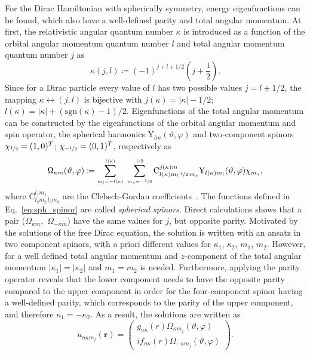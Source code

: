 For the Dirac Hamiltonian with spherically symmetry, energy eigenfunctions can be found, which also have a well-defined parity and total angular momentum. At first, the relativistic angular quantum number $\kappa$ is introduced as a function of the orbital angular momentum quantum number $l$ and total angular momentum quantum number $j$ as
\begin{equation}
\kappa(j,l) \coloneqq (-1)^{j+l+1/2} \left(j+\frac{1}{2}\right).
\end{equation}
Since for a Dirac particle every value of $l$ has two possible values $j=l\pm 1/2$, the mapping $\kappa \leftrightarrow (j,l)$ is bijective with $j(\kappa)=|\kappa|-1/2$; $l(\kappa)=|\kappa|+(\mathrm{sgn}(\kappa)-1)/2$. Eigenfunctions of the total angular momentum can be constructed by the eigenfunctions of the orbital angular momentum and spin operator, the spherical harmonics $\text{Y}_{lm}(\vartheta,\varphi)$ and two-component spinors $\chi_{\nicefrac{1}{2}}=(1,0)^T$; $\chi_{\nicefrac{-1}{2}}=(0,1)^T$, respectively as
\begin{equation}
\Omega_{\kappa m}(\vartheta,\varphi)\coloneqq
\sum_{{\scriptscriptstyle {m_l}{=}{-l(\kappa)}}}^{\scriptscriptstyle l(\kappa)}\;
\sum_{{\scriptscriptstyle {m_s}{=}{\nicefrac{-1}{2}}}}^{\scriptscriptstyle \nicefrac{1}{2}}
\text{C}^{j(\kappa)m}_{l(\kappa)m_l\,\nicefrac{1}{2}\,m_s}
\text{Y}_{l(\kappa)m_l}(\vartheta,\varphi)\chi_{m_s},
\label{eq:sph_spinor}
\end{equation}
where $\text{C}^{l_1m_1}_{l_2m_2\,l_3m_3}$ are the Clebsch-Gordan coefficients~\cite{varshalovich1988}. The functions defined in Eq.~\eqref{eq:sph_spinor} are called \textit{spherical spinors}. Direct calculations shows that a pair \mbox{($\Omega_{\kappa m}$, $\Omega_{-\kappa m}$)} have the same values for $j$, but opposite parity. Motivated by the solutions of the free Dirac equation, the solution is written with an ansatz in two component spinors, with a priori different values for $\kappa_1$, $\kappa_2$, $m_1$, $m_2$. 
However, for a well defined total angular momentum and $z$-component of the total angular momentum $|\kappa_1|=|\kappa_2|$ and $m_1=m_2$ is needed. Furthermore, applying the parity operator reveals that the lower component needs to have the opposite parity compared to the upper component in order for the four-component spinor having a well-defined parity, which corresponds to the parity of the upper component, and therefore $\kappa_1=-\kappa_2$. As a result, the solutions are written as
\begin{equation}
u_{n\kappa m_j}(\mathbf{r})=
\begin{pmatrix}
g_{n\kappa}(r)\Omega_{\kappa m_j}(\vartheta,\varphi)\\
i f_{n\kappa}(r) \Omega_{-\kappa m_j}(\vartheta,\varphi)
\end{pmatrix}.
\label{eq:ansatz_dirac}
\end{equation}
